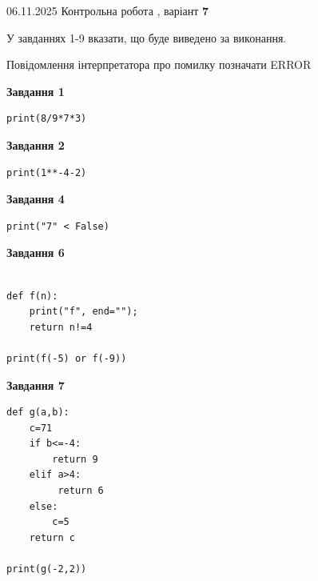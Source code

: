 \documentclass[12pt, ukrainian]{article}
\begin{document}
{\Large{06.11.2025 Контрольна робота , варіант  \No \textbf { 7 }\par}}
{
\begin {large}
У завданнях 1-9 вказати, що буде виведено за виконання.

Повідомлення інтерпретатора про помилку позначати ERROR

\begin{minipage}[t]{7.5cm}

\begin{center}
\textbf{Завдання 1}
\end{center}

\begin{verbatim}
print(8/9*7*3)
\end{verbatim}



\begin{center}
\textbf{Завдання 2}
\end{center}

\begin{verbatim}
print(1**-4-2)
\end{verbatim}



\begin{center}
\textbf{Завдання 4}
\end{center}

\begin{verbatim}
print("7" < False)
\end{verbatim}



\begin{center}
\textbf{Завдання 6}
\end{center}

\begin{verbatim}

def f(n):
    print("f", end="");
    return n!=4

print(f(-5) or f(-9))
\end{verbatim}



\begin{center}
\textbf{Завдання 7}
\end{center}

\begin{verbatim}
def g(a,b):
    c=71
    if b<=-4:
        return 9
    elif a>4:
         return 6
    else: 
        c=5
    return c

print(g(-2,2))
\end{verbatim}


\end{minipage}
\end{large}}
\end{document}
